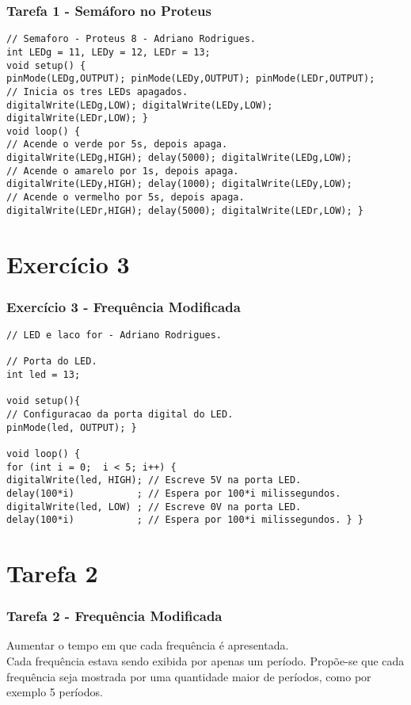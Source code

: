 \documentclass{beamer}
\begin{document}
\begin{frame}[fragile]
	\frametitle{Tarefa 1 - Semáforo no Proteus}
	\begin{lstlisting}[style=Arduino,basicstyle=\scriptsize \ttfamily]
// Semaforo - Proteus 8 - Adriano Rodrigues.
int LEDg = 11, LEDy = 12, LEDr = 13;
void setup() {
pinMode(LEDg,OUTPUT); pinMode(LEDy,OUTPUT); pinMode(LEDr,OUTPUT);
// Inicia os tres LEDs apagados.
digitalWrite(LEDg,LOW); digitalWrite(LEDy,LOW); digitalWrite(LEDr,LOW); }
void loop() {
// Acende o verde por 5s, depois apaga.
digitalWrite(LEDg,HIGH); delay(5000); digitalWrite(LEDg,LOW);
// Acende o amarelo por 1s, depois apaga.
digitalWrite(LEDy,HIGH); delay(1000); digitalWrite(LEDy,LOW);
// Acende o vermelho por 5s, depois apaga.
digitalWrite(LEDr,HIGH); delay(5000); digitalWrite(LEDr,LOW); } \end{lstlisting}
\end{frame}

\section{Exercício 3}
\begin{frame}[fragile]
	\frametitle{Exercício 3 - Frequência Modificada}
	\begin{lstlisting}[style=Arduino,basicstyle=\scriptsize \ttfamily]
// LED e laco for - Adriano Rodrigues.

// Porta do LED.
int led = 13;

void setup(){
// Configuracao da porta digital do LED.
pinMode(led, OUTPUT); }

void loop() {
for (int i = 0;  i < 5; i++) {
digitalWrite(led, HIGH); // Escreve 5V na porta LED.
delay(100*i)           ; // Espera por 100*i milissegundos.
digitalWrite(led, LOW) ; // Escreve 0V na porta LED.
delay(100*i)           ; // Espera por 100*i milissegundos. } } \end{lstlisting}
\end{frame}

\section{Tarefa 2}
\begin{frame}[fragile]
	\frametitle{Tarefa 2 - Frequência Modificada}
	Aumentar o tempo em que cada frequência é apresentada.\\[10pt]
	Cada frequência estava sendo exibida por apenas um período. Propõe-se que cada frequência seja mostrada por uma quantidade maior de períodos, como por exemplo 5 períodos.
\end{frame}
\end{document}
